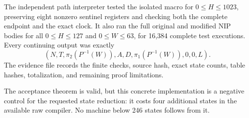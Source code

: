 The independent path interpreter tested the isolated macro for
$0\le H\le1023$, preserving eight nonzero sentinel registers and checking both
the complete endpoint and the exact clock.  It also ran the full original and
modified NIP bodies for all $0\le H\le127$ and $0\le W\le63$, for 16,384
complete test executions.  Every continuing output was exactly
\[
 (N,T,\pi_2(P^{-1}(W)),A,D,\pi_1(P^{-1}(W)),0,0,L).
\]
The evidence file records the finite checks, source hash, exact state counts,
table hashes, totalization, and remaining proof limitations.

The acceptance theorem is valid, but this concrete implementation is a
negative control for the requested state reduction: it costs four additional
states in the available raw compiler.  No machine below 246 states follows
from it.
